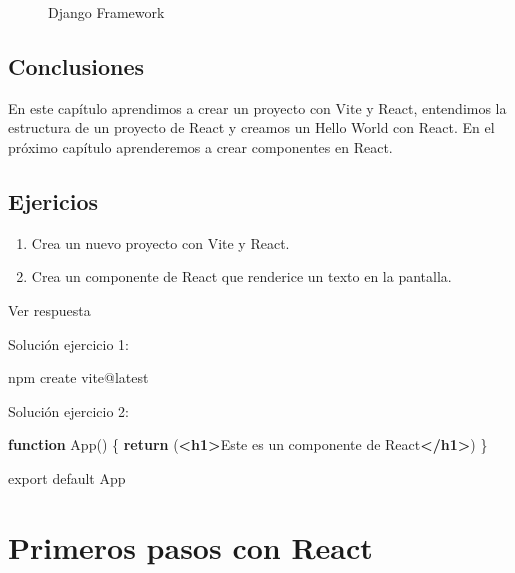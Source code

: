 \documentclass[
  a4paper,
  DIV=11,
  numbers=noendperiod,
  onepage,
  openany]{scrreprt}
\newenvironment{Shaded}{\begin{snugshade}}{\end{snugshade}}
\newcommand{\ControlFlowTok}[1]{\textcolor[rgb]{0.00,0.23,0.31}{\textbf{#1}}}
\newcommand{\ExtensionTok}[1]{\textcolor[rgb]{0.00,0.23,0.31}{#1}}
\newcommand{\FunctionTok}[1]{\textcolor[rgb]{0.28,0.35,0.67}{#1}}
\newcommand{\ImportTok}[1]{\textcolor[rgb]{0.00,0.46,0.62}{#1}}
\newcommand{\KeywordTok}[1]{\textcolor[rgb]{0.00,0.23,0.31}{\textbf{#1}}}
\newcommand{\NormalTok}[1]{\textcolor[rgb]{0.00,0.23,0.31}{#1}}
\providecommand{\tightlist}{%
  \setlength{\itemsep}{0pt}\setlength{\parskip}{0pt}}\usepackage{longtable,booktabs,array}
\begin{document}
\begin{tcolorbox}
\begin{figure}[H]
{}

\caption{Django Framework}

\end{figure}%

\section{Conclusiones}\label{conclusiones-6}

En este capítulo aprendimos a crear un proyecto con Vite y React,
entendimos la estructura de un proyecto de React y creamos un Hello
World con React. En el próximo capítulo aprenderemos a crear componentes
en React.

\section{Ejericios}\label{ejericios}

\begin{enumerate}
\def\labelenumi{\arabic{enumi}.}
\tightlist
\item
  Crea un nuevo proyecto con Vite y React.
\item
  Crea un componente de React que renderice un texto en la pantalla.
\end{enumerate}

Ver respuesta

Solución ejercicio 1:

\begin{Shaded}
\begin{Highlighting}[]
\ExtensionTok{npm}\NormalTok{ create vite@latest}
\end{Highlighting}
\end{Shaded}

Solución ejercicio 2:

\begin{Shaded}
\begin{Highlighting}[]
\KeywordTok{function} \FunctionTok{App}\NormalTok{() \{}
  \ControlFlowTok{return}\NormalTok{ (}\KeywordTok{\textless{}h1\textgreater{}}\NormalTok{Este es un componente de React}\KeywordTok{\textless{}/h1\textgreater{}}\NormalTok{)}
\NormalTok{\}}

\ImportTok{export} \ImportTok{default}\NormalTok{ App}
\end{Highlighting}
\end{Shaded}

\chapter{Primeros pasos con React}\label{primeros-pasos-con-react}


\end{tcolorbox}
\end{document}
